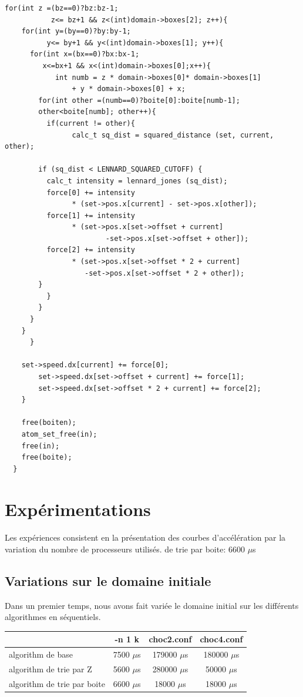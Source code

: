 \documentclass[a4paper,11pt]{report}
\begin{document}
\begin{lstlisting}[style=CStyle]
      for(int z =(bz==0)?bz:bz-1; 
		   z<= bz+1 && z<(int)domain->boxes[2]; z++){
	for(int y=(by==0)?by:by-1; 
		  y<= by+1 && y<(int)domain->boxes[1]; y++){
	  for(int x=(bx==0)?bx:bx-1;
		 x<=bx+1 && x<(int)domain->boxes[0];x++){
            int numb = z * domain->boxes[0]* domain->boxes[1] 
				+ y * domain->boxes[0] + x;
	    for(int other =(numb==0)?boite[0]:boite[numb-1]; 
		other<boite[numb]; other++){
	      if(current != other){
                calc_t sq_dist = squared_distance (set, current, other);

		if (sq_dist < LENNARD_SQUARED_CUTOFF) {
		  calc_t intensity = lennard_jones (sq_dist);
		  force[0] += intensity 
				* (set->pos.x[current] - set->pos.x[other]);
		  force[1] += intensity 
				* (set->pos.x[set->offset + current] 
			            -set->pos.x[set->offset + other]);
		  force[2] += intensity 
				* (set->pos.x[set->offset * 2 + current] 
				   -set->pos.x[set->offset * 2 + other]);
		}
	      }
	    }
	  }
	}
      } 
	
	set->speed.dx[current] += force[0];
        set->speed.dx[set->offset + current] += force[1];
        set->speed.dx[set->offset * 2 + current] += force[2];
    }
    
    free(boiten);
    atom_set_free(in);
    free(in);
    free(boite);
  }
\end{lstlisting}

\section{Expérimentations}
\paragraph{}
Les expériences consistent en la présentation des courbes d'accélération par la variation du nombre de processeurs utilisés.  de trie par boite:  6600  $\mu$s

\subsection{Variations sur le domaine initiale}
Dans un premier temps, nous avons fait variée le domaine initial sur les différents algorithmes en séquentiels.
\begin{center}
\begin{tabular}{ |l | c | c | c | }
\hline
 & -n 1 k & choc2.conf & choc4.conf \\
\hline
algorithm de base & 7500  $\mu$s& 179000  $\mu$s& 180000  $\mu$s\\
algorithm de trie par Z & 5600  $\mu$s& 280000  $\mu$s& 50000  $\mu$s\\
algorithm de trie par boite & 6600  $\mu$s& 18000  $\mu$s& 18000  $\mu$s\\
\hline

\end{tabular}
\end{center}
\end{document}
